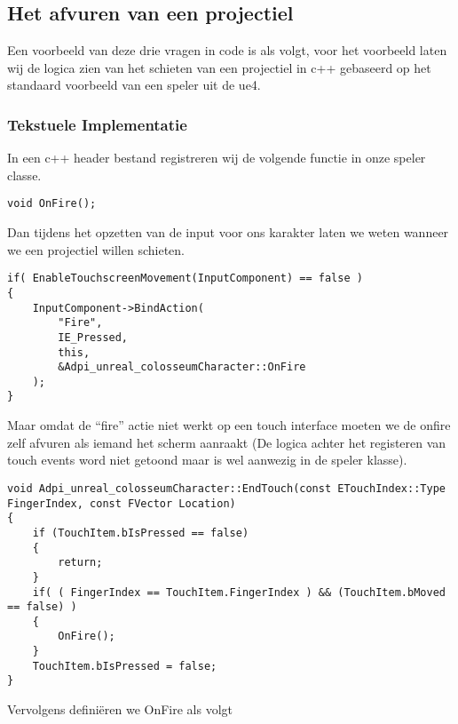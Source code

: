 \subsection{Het afvuren van een projectiel}
Een voorbeeld van deze drie vragen in code is als volgt, voor het voorbeeld laten wij de logica zien van het schieten van een projectiel in c++ gebaseerd op het standaard voorbeeld van een speler uit de \gls{ue4}.

\subsubsection{Tekstuele Implementatie}
In een c++ header bestand registreren wij de volgende functie in onze speler classe.
\begin{lstlisting}[caption=Registratie van de OnFire functie]
void OnFire();
\end{lstlisting}
Dan tijdens het opzetten van de input voor ons karakter laten we weten wanneer we een projectiel willen schieten.

\begin{lstlisting}[caption=Koppellen van de Fire actie aan de OndFire functie]
if( EnableTouchscreenMovement(InputComponent) == false )
{
	InputComponent->BindAction(
		"Fire", 
		IE_Pressed, 
		this, 
		&Adpi_unreal_colosseumCharacter::OnFire
	);
}
\end{lstlisting}
Maar omdat de “fire” actie niet werkt op een touch interface moeten we de onfire zelf afvuren als iemand het scherm aanraakt (De logica achter het registeren van touch events word niet getoond maar is wel aanwezig in de speler klasse).

\begin{lstlisting}[caption=Aanroepen van de OnFire functie tijdens het EndTouch event]
void Adpi_unreal_colosseumCharacter::EndTouch(const ETouchIndex::Type FingerIndex, const FVector Location)
{
	if (TouchItem.bIsPressed == false)
	{
		return;
	}
	if( ( FingerIndex == TouchItem.FingerIndex ) && (TouchItem.bMoved == false) )
	{
		OnFire();
	}
	TouchItem.bIsPressed = false;
}
\end{lstlisting}
Vervolgens definiëren we OnFire als volgt

